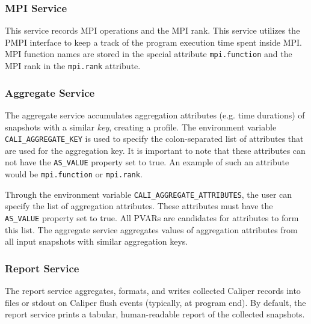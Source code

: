 \subsubsection{MPI Service}
This service records MPI operations and the MPI rank. This service utilizes the PMPI interface to keep a track of the program execution time spent inside MPI. MPI function names are stored in the special attribute \verb+mpi.function+ and the MPI rank in the \verb+mpi.rank+ attribute.
\subsubsection{Aggregate Service}
The aggregate service accumulates aggregation attributes (e.g. time durations) of snapshots with a similar \textit{key}, creating a profile. The environment variable \verb+CALI_AGGREGATE_KEY+ is used to specify the colon-separated list of attributes that are used for the aggregation key. It is important to note that these attributes can not have the \verb+AS_VALUE+ property set to true. An example of such an attribute would be \verb+mpi.function+ or \verb+mpi.rank+.
\par Through the environment variable \verb+CALI_AGGREGATE_ATTRIBUTES+, the user can specify the list of aggregation attributes. These attributes must have the \verb+AS_VALUE+ property set to true. All PVARs are candidates for attributes to form this list. The aggregate service aggregates values of aggregation attributes from all input snapshots with similar aggregation keys.
\subsubsection{Report Service}
The report service aggregates, formats, and writes collected Caliper records into files or stdout on Caliper flush events (typically, at program end). By default, the report service prints a tabular, human-readable report of the collected snapshots.

